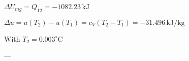 \( \Delta U_{mg} = Q_{12} = -1082.23 \, \text{kJ} \)  

\( \Delta u = u(T_2) - u(T_1) = c_V (T_2 - T_1) = -31.496 \, \text{kJ/kg} \)  

With \( T_2 = 0.003^\circ \text{C} \)  

---